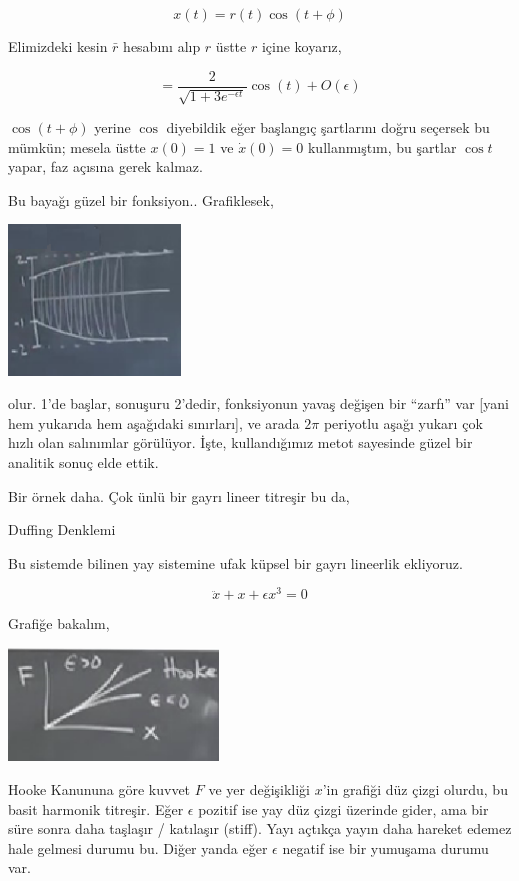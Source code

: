\documentclass[12pt,fleqn]{article}\usepackage{../../common}
\begin{document}
$$ x(t) = r(t) \cos(t+\phi) $$

Elimizdeki kesin $\bar{r}$ hesabını alıp $r$ üstte $r$ içine koyarız, 

$$ = \frac{2}{\sqrt{ 1 + 3 e^{-\epsilon t} }} \cos (t) + O(\epsilon) $$

$\cos (t+\phi)$ yerine $\cos$ diyebildik eğer başlangıç şartlarını doğru
seçersek bu mümkün; mesela üstte $x(0) = 1$ ve $\dot{x}(0) = 0$ kullanmıştım, bu
şartlar $\cos t$ yapar, faz açısına gerek kalmaz. 

Bu bayağı güzel bir fonksiyon.. Grafiklesek,

\includegraphics[height=4cm]{11_07.png}

olur. 1'de başlar, sonuşuru 2'dedir, fonksiyonun yavaş değişen bir ``zarfı'' var
[yani hem yukarıda hem aşağıdaki sınırları], ve arada $2\pi$ periyotlu aşağı
yukarı çok hızlı olan salınımlar görülüyor. İşte, kullandığımız metot sayesinde
güzel bir analitik sonuç elde ettik.

Bir örnek daha. Çok ünlü bir gayrı lineer titreşir bu da,

Duffing Denklemi

Bu sistemde bilinen yay sistemine ufak küpsel bir gayrı lineerlik ekliyoruz. 

$$ \ddot{x} + x + \epsilon x^3 = 0$$

Grafiğe bakalım,

\includegraphics[height=3cm]{11_08.png}

Hooke Kanununa göre kuvvet $F$ ve yer değişikliği $x$'in grafiği düz çizgi
olurdu, bu basit harmonik titreşir. Eğer $\epsilon$ pozitif ise yay düz çizgi
üzerinde gider, ama bir süre sonra daha taşlaşır / katılaşır (stiff). Yayı
açtıkça yayın daha hareket edemez hale gelmesi durumu bu. Diğer yanda eğer
$\epsilon$ negatif ise bir yumuşama durumu var.
\end{document}
